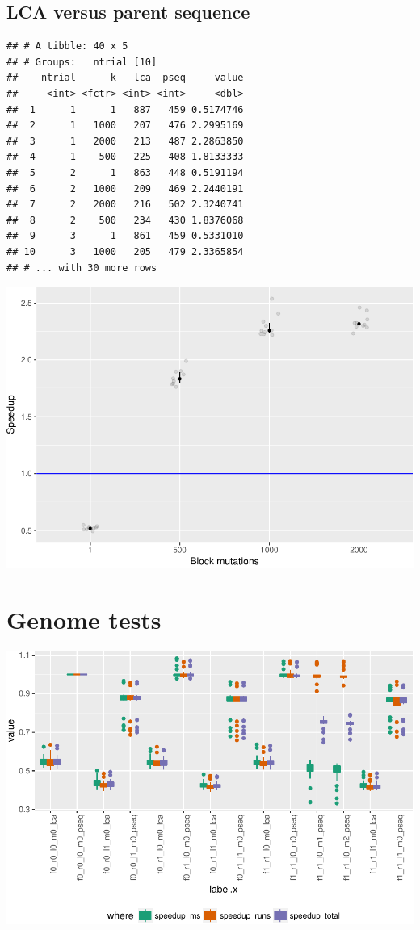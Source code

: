 \documentclass[]{article}
\begin{document}
\subsection{LCA versus parent
sequence}\label{lca-versus-parent-sequence}

\begin{verbatim}
## # A tibble: 40 x 5
## # Groups:   ntrial [10]
##    ntrial      k   lca  pseq     value
##     <int> <fctr> <int> <int>     <dbl>
##  1      1      1   887   459 0.5174746
##  2      1   1000   207   476 2.2995169
##  3      1   2000   213   487 2.2863850
##  4      1    500   225   408 1.8133333
##  5      2      1   863   448 0.5191194
##  6      2   1000   209   469 2.2440191
##  7      2   2000   216   502 2.3240741
##  8      2    500   234   430 1.8376068
##  9      3      1   861   459 0.5331010
## 10      3   1000   205   479 2.3365854
## # ... with 30 more rows
\end{verbatim}

\includegraphics{sea_2018_files/figure-latex/unnamed-chunk-2-1.pdf}

\section{Genome tests}\label{genome-tests}

\includegraphics{sea_2018_files/figure-latex/genome-tests-1.pdf}
\end{document}
